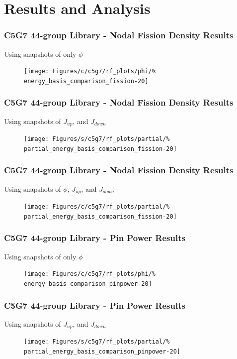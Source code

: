 \documentclass[fleqn]{beamer}
\begin{document}
    \section{Results and Analysis}

    \begin{frame}
        \frametitle{C5G7 44-group Library - Nodal Fission Density Results}
        \centering
        Using snapshots of only $\phi$
        \begin{figure}
            \texttt{[image: Figures/c/c5g7/rf\_plots/phi/\%
                energy\_basis\_comparison\_fission-20]}
        \end{figure}
    \end{frame}

    \begin{frame}
        \frametitle{C5G7 44-group Library - Nodal Fission Density Results}
        \centering
        Using snapshots of $J_{up}$, and $J_{down}$
        \begin{figure}
            \texttt{[image: Figures/s/c5g7/rf\_plots/partial/\%
                partial\_energy\_basis\_comparison\_fission-20]}
        \end{figure}
    \end{frame}

    \begin{frame}
        \frametitle{C5G7 44-group Library - Nodal Fission Density Results}
        \centering
        Using snapshots of $\phi$, $J_{up}$, and $J_{down}$
        \begin{figure}
            \texttt{[image: Figures/c/c5g7/rf\_plots/partial/\%
                partial\_energy\_basis\_comparison\_fission-20]}
        \end{figure}
    \end{frame}

    \begin{frame}
        \frametitle{C5G7 44-group Library - Pin Power Results}
        \centering
        Using snapshots of only $\phi$
        \begin{figure}
            \texttt{[image: Figures/c/c5g7/rf\_plots/phi/\%
                energy\_basis\_comparison\_pinpower-20]}
        \end{figure}
    \end{frame}

    \begin{frame}
        \frametitle{C5G7 44-group Library - Pin Power Results}
        \centering
        Using snapshots of $J_{up}$, and $J_{down}$
        \begin{figure}
            \texttt{[image: Figures/s/c5g7/rf\_plots/partial/\%
                partial\_energy\_basis\_comparison\_pinpower-20]}
        \end{figure}
    \end{frame}
\end{document}
